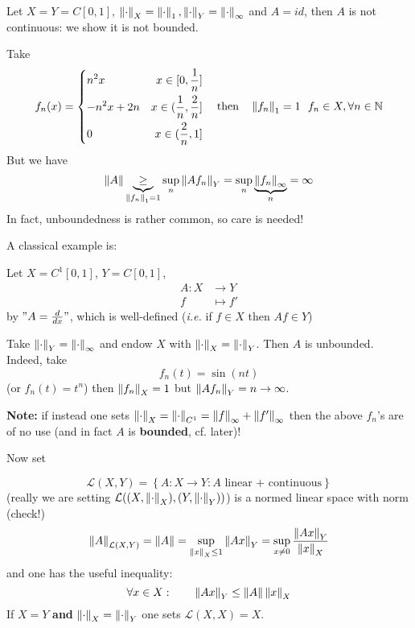 \documentclass{article}
\begin{document}
\begin{example}
    Let $X=Y=C[0,1]$, $\left\|{\cdot}\right\|_X=\left\|{\cdot}\right\|_1, \left\|{\cdot}\right\|_Y=\left\|{\cdot}\right\|_{\infty}$ and $A=id$, then $A$ is not continuous: we show it is not bounded.  

    Take 
    \begin{equation}\nonumber
f_n(x)=\left\{
\begin{split}
    &{n^2x} &x\in[0,\frac{1}{n}]\\
    &{-n^2x+2n} &x\in(\frac{1}{n},\frac{2}{n}]\\
    &0 &x\in(\frac{2}{n},1]\\
\end{split}
\right.\quad\text{then}\quad\left\|{f_n}\right\|_1=1  \  \ f_n \in X, \forall n \in \mathbb{N}
\end{equation}
But we have  
$$
\left\|{A}\right\| \underbrace{\geq}_{\left\|{f_n}\right\|_1=1} \sup_n \left\|{Af_n}\right\|_Y = \sup_n \underbrace{\left\|{f_n}\right\|_{\infty}}_n = \infty
$$
In fact, unboundedness is rather common, so care is needed!  
\end{example}  

A classical example is:  

\begin{example}
    Let $X=C^1[0,1]$, $Y=C[0,1]$, 
    \begin{align*}
        A: X &\to Y \\
        f &\mapsto f'
    \end{align*}
    by $"A = \frac{d}{dx}"$, which is well-defined (\textit{i.e.} if $f\in X$ then $Af \in Y$)

    Take $\left\|{\cdot}\right\|_Y = \left\|{\cdot}\right\|_{\infty}$ and endow $X$ with $\left\|{\cdot}\right\|_X = \left\|{\cdot}\right\|_Y$. Then $A$ is unbounded. Indeed, take  
    $$
    f_n(t) = \sin(nt) 
    $$
    (or $f_n(t)=t^n$) then $\left\|{f_n}\right\|_X=1$ but $\left\|{Af_n}\right\|_Y=n \to \infty$.

    \textbf{Note:} if instead one sets $\left\|{\cdot}\right\|_X = \left\|{\cdot}\right\|_{C^1}=\left\|{f}\right\|_{\infty}+\left\|{f'}\right\|_{\infty}$ then the above $f_n$'s are of no use (and in fact $A$ is \textbf{bounded}, cf. later)!
\end{example}  

Now set 

$$
\mathcal{L}(X, Y) = \left\{A: X \to Y: A \text{\ linear\ +\ continuous} \right\}
$$
(really we are setting $\mathcal{L}((X, \left\|{\cdot}\right\|_X), (Y, \left\|{\cdot}\right\|_Y))$)  
is a normed linear space with norm (check!)  
$$
\left\|{A}\right\|_{\mathcal{L}(X, Y)} = \left\|{A}\right\| = \sup_{\left\|{x}\right\|_X\leq 1} \left\|{Ax}\right\|_Y = \sup_{x \neq 0} \frac{\left\|{Ax}\right\|_Y}{\left\|{x}\right\|_X}
$$ 
and one has the useful inequality:  
$$
\forall x \in X: \qquad \left\|{Ax}\right\|_Y \leq \left\|{A}\right\| \left\|{x}\right\|_X
$$
If $X=Y$ \textbf{and} $\left\|{\cdot}\right\|_X = \left\|{\cdot}\right\|_Y$ one sets $\mathcal{L}(X, X)=X$.  
\end{document}
